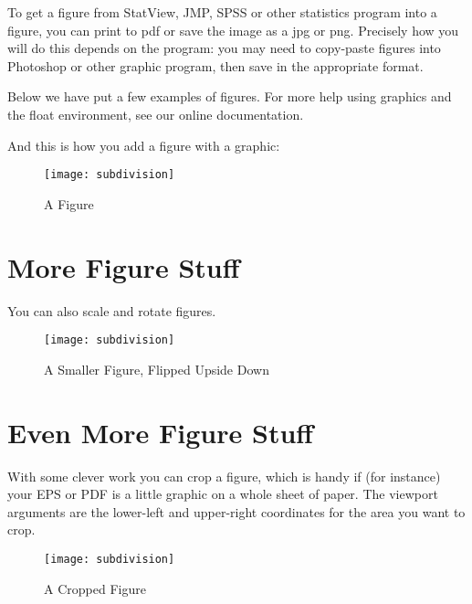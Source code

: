 \documentclass[12pt,twoside]{reedthesis}
\begin{document}
To get a figure from StatView, JMP, SPSS or other statistics program into a figure, you can print to pdf or save the image as a jpg or png. Precisely how you will do this depends on the program: you may need to copy-paste figures into Photoshop or other graphic program, then save in the appropriate format.

Below we have put a few examples of figures. For more help using graphics and the float environment, see our online documentation.

And this is how you add a figure with a graphic:
\begin{figure}[h]

  \centering
  \texttt{[image: subdivision]}
  \caption{A Figure}
  \label{subd}
\end{figure}

\clearpage %

\section{More Figure Stuff}
You can also scale and rotate figures.
\begin{figure}[h!]

  \centering
  \texttt{[image: subdivision]}
  \caption{A Smaller Figure, Flipped Upside Down}
  \label{subd2}
\end{figure}

\section{Even More Figure Stuff}
With some clever work you can crop a figure, which is handy if (for instance) your EPS or PDF is a little graphic on a whole sheet of paper. The viewport arguments are the lower-left and upper-right coordinates for the area you want to crop.

\begin{figure}[h!]
  \centering
  \texttt{[image: subdivision]}
  \caption{A Cropped Figure}
  \label{subd3}
\end{figure}
\end{document}
